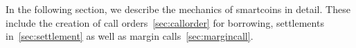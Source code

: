 In the following section, we describe the mechanics of smartcoins in
detail. These include the creation of call orders~\cref{sec:callorder}
for borrowing, settlements in~\cref{sec:settlement} as well as margin
calls~\cref{sec:margincall}.
